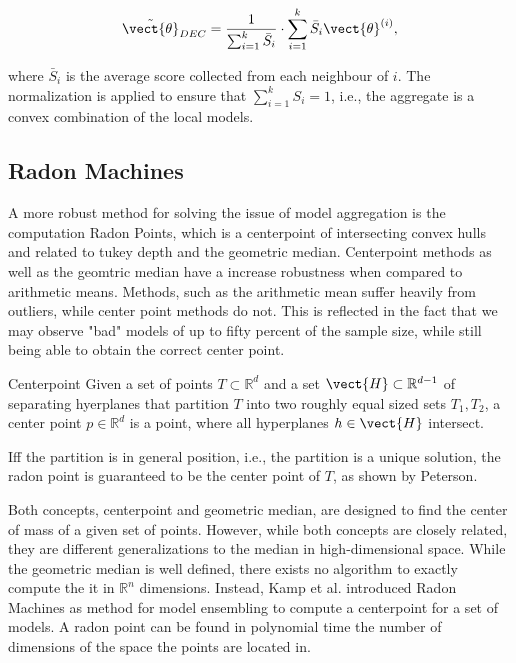 \begin{equation}
    \tilde{\vect{\theta}}_{DEC} = \frac{1}{\sum_{i=1}^k \bar{S}_i} \cdot \sum_{i=1}^k \bar{S}_i \vect{\theta}^{(i)},
\end{equation}

where $\bar{S}_i$ is the average score collected from each neighbour of $i$. 
The normalization is applied to ensure that $\sum_{i=1}^k S_i = 1$, i.e., the aggregate is a convex combination of the local models.

\subsection{Radon Machines}
\label{ssec:radon}
A more robust method for solving the issue of model aggregation is the computation Radon Points, which is a centerpoint of intersecting convex hulls and related to tukey depth and the geometric median. 
Centerpoint methods as well as the geomtric median have a increase robustness when compared to arithmetic means.
Methods, such as the arithmetic mean suffer heavily from outliers, while center point methods do not.
This is reflected in the fact that we may observe "bad" models of up to fifty percent of the sample size, while still being able to obtain the correct center point.

\begin{definition}[parbox=false]{Centerpoint}
    Given a set of points $T \subset \mathbb{R}^{d}$ and a set  $\vect{H} \subset \mathbb{R}^{d-1}$ of separating hyerplanes that partition $T$  into two roughly equal sized sets $T_1, T_2$, a center point $p \in \mathbb{R}^d$ is a point, where all hyperplanes $h \in \vect{H}$ intersect.

    Iff the partition is in general position, i.e., the partition is a unique solution, the radon point is guaranteed to be the center point of $T$, as shown by Peterson.~\cite{peterson1972geometry}
\end{definition}

Both concepts, centerpoint and geometric median, are designed to find the center of mass of a given set of points.
However, while both concepts are closely related, they are different generalizations to the median in high-dimensional space.
While the geometric median is well defined, there exists no algorithm to exactly compute the it in $\mathbb{R}^n$ dimensions.
Instead, Kamp et al. \cite{kamp2017effective} introduced Radon Machines as method for model ensembling to compute a centerpoint for a set of models.
A radon point can be found in polynomial time \wrt the number of dimensions of the space the points are located in.
